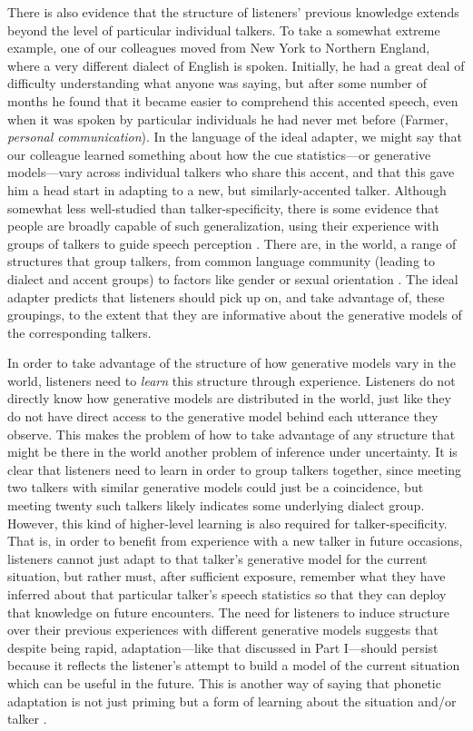 There is also evidence that the structure of listeners' previous knowledge extends beyond the level of particular individual talkers.  To take a somewhat extreme example, one of our colleagues moved from New York to Northern England, where a very different dialect of English is spoken.  Initially, he had a great deal of difficulty understanding what anyone was saying, but after some number of months he found that it became easier to comprehend this accented speech, even when it was spoken by particular individuals he had never met before (Farmer, \emph{personal communication}).  In the language of the ideal adapter, we might say that our colleague learned something about how the cue statistics---or generative models---vary across individual talkers who share this accent, and that this gave him a head start in adapting to a new, but similarly-accented talker.  Although somewhat less well-studied than talker-specificity, there is some evidence that people are broadly capable of such generalization, using their experience with groups of talkers to guide speech perception \autocite{Bradlow2008,Baese-berk2013,Creel2011,Johnson1999,Johnson2006,Niedzielski1999,Sidaras2009}.  There are, in the world, a range of structures that group talkers, from common language community (leading to dialect and accent groups) to factors like gender or sexual orientation \autocite{Munson2007}.
The ideal adapter predicts that listeners should pick up on, and take advantage of, these groupings, to the extent that they are informative about the generative models of the corresponding talkers.

In order to take advantage of the structure of how generative models vary in the world, listeners need to \emph{learn} this structure through experience.  Listeners do not directly know how generative models are distributed in the world, just like they do not have direct access to the generative model behind each utterance they observe.  This makes the problem of how to take advantage of any structure that might be there in the world another problem of inference under uncertainty.   It is clear that listeners need to learn in order to group talkers together, since meeting two talkers with similar generative models could just be a coincidence, but meeting twenty such talkers likely indicates some underlying dialect group.  However, this kind of higher-level learning is also required for talker-specificity.  That is, in order to benefit from experience with a new talker in future occasions, listeners cannot just adapt to that talker's generative model for the current situation, but rather must, after sufficient exposure, remember what they have inferred about that particular talker's speech statistics so that they can deploy that knowledge on future encounters.  The need for listeners to induce structure over their previous experiences with different generative models suggests that despite being rapid, adaptation---like that discussed in Part I---should persist because it reflects the listener's attempt to build a model of the current situation which can be useful in the future.  This is another way of saying that phonetic adaptation is not just priming but a form of learning about the situation and/or talker \autocite[among others]{Eisner2006,Kraljic2005,Kraljic2008a}.

